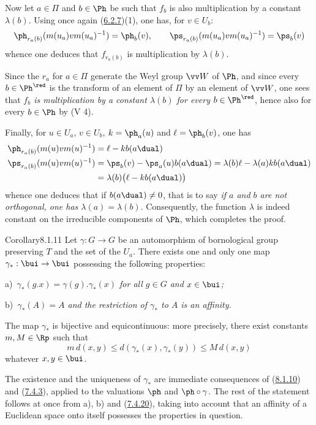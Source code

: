 \documentclass[12pt,a4paper,oneside,english]{smfart}
\makeatletter
\newcommand{\btanchor}[1]{\leavevmode\Hy@raisedlink{\hypertarget{bt:#1}{}}}
\newcommand{\btpageanchor}[1]{\Hy@raisedlink{\hypertarget{p:#1}{}}}
\newcommand{\btref}[1]{\hyperlink{bt:#1}{#1}}
\newcommand{\btpage}[1]{\marginnote{p.~#1}\btpageanchor{#1}}
\newcommand{\pg}[1]{\btpage{#1}}
\theoremstyle{definition}
\theoremstyle{bt}
\makeatother
\begin{document}
Now let $a\in\Pi$ and $b\in\Ph$ be such that $f_b$ is also multiplication by a constant
$\lambda(b)$. Using once again (\btref{6.2.7})(1), one has, for $v\in U_b$:
\[
\ph_{r_a(b)}(m(u_a)vm(u_a)^{-1})=\ph_b(v),\qquad
\ps_{r_a(b)}(m(u_a)vm(u_a)^{-1})=\ps_b(v)
\]
whence one deduces that $f_{r_a(b)}$ is multiplication by $\lambda(b)$.

Since the $r_a$ for $a\in\Pi$ generate the Weyl group $\vv W$ of $\Ph$, and since every
$b\in\Ph^{\red}$ is the transform of an element of $\Pi$ by an element of $\vv W$, one
sees that \emph{$f_b$ is multiplication by a constant $\lambda(b)$ for every
$b\in\Ph^{\red}$}, hence also for every $b\in\Ph$ by (V 4).

Finally, for $u\in U_a$, $v\in U_b$, $k=\ph_a(u)$ and $\ell=\ph_b(v)$, one has
\begin{align*}
\ph_{r_a(b)}(m(u)vm(u)^{-1})&=\ell-kb(a\dual)\\
\ps_{r_a(b)}(m(u)vm(u)^{-1})&=\ps_b(v)-\ps_a(u)b(a\dual)
=\lambda(b)\ell-\lambda(a)kb(a\dual)\\
&=\lambda(b)\bigl(\ell-kb(a\dual)\bigr)
\end{align*}
whence one deduces that if $b(a\dual)\neq0$, that is to say \emph{if $a$ and $b$ are not
orthogonal, one has $\lambda(a)=\lambda(b)$}. Consequently, the function $\lambda$ is
indeed constant on the irreducible components of $\Ph$, which completes the proof.

\pg{193}
\begin{stmt}{Corollary}{8.1.11}\btanchor{8.1.11}
Let $\gamma:G\to G$ be an automorphism of bornological group preserving $T$ and the set
of the $U_a$. There exists one and only one map $\gamma_*:\bui\to\bui$ possessing the
following properties:

\upshape a)\itshape\ $\gamma_*(g.x)=\gamma(g).\gamma_*(x)$ for all $g\in G$ and
$x\in\bui$;

\upshape b)\itshape\ $\gamma_*(A)=A$ and the restriction of $\gamma_*$ to $A$ is an
affinity.

The map $\gamma_*$ is bijective and equicontinuous: more precisely, there exist
constants $m,M\in\Rp$ such that
\[
m\,d(x,y)\leqslant d(\gamma_*(x),\gamma_*(y))\leqslant M\,d(x,y)
\]
whatever $x,y\in\bui$.
\end{stmt}

The existence and the uniqueness of $\gamma_*$ are immediate consequences of (\btref{8.1.10})
and (\btref{7.4.3}), applied to the valuations $\ph$ and $\ph\circ\gamma$. The rest of the
statement follows at once from a), b) and (\btref{7.4.20}), taking into account that an affinity
of a Euclidean space onto itself possesses the properties in question.
\end{document}
